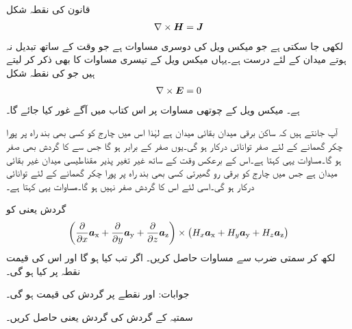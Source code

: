  قانون کی نقطہ شکل
\begin{align}\label{مساوات-مقناطیسی_مقناطیسی_گردش_صفر}
\nabla \times {\ensuremath{{\boldsymbol{H}}}}={{\boldsymbol{J}}}
\end{align}
لکھی جا سکتی ہے جو  میکس ویل کی دوسری مساوات ہے جو وقت کے ساتھ تبدیل نہ ہوتے میدان کے لئے درست ہے۔یہاں میکس ویل کے تیسری مساوات کا بھی ذکر کر لیتے ہیں جو  کی نقطہ شکل
\begin{align}\label{مساوات-مقناطیسی_برقی_گردش_صفر}
\nabla \times {\ensuremath{{\boldsymbol{E}}}}=0
\end{align}
ہے۔ میکس ویل کے چوتھی مساوات پر اس کتاب میں آگے غور کیا جائے گا۔

آپ جانتے ہیں کہ ساکن برقی میدان  بقائی میدان ہے لہٰذا اس میں چارج  کو کسی بھی بند راہ پر پورا چکر گھمانے کے لئے صفر توانائی درکار ہو گی۔یوں  صفر کے برابر ہو گا جس سے  کا گردش بھی صفر ہو گا۔مساوات  یہی کہتا ہے۔اس کے برعکس وقت کے ساتھ غیر تغیر پذیر مقناطیسی میدان غیر بقائی میدان ہے جس میں چارج کو برقی رو گھیرتی کسی بھی بند راہ پر پورا چکر گھمانے کے لئے توانائی درکار ہو گی۔اسی لئے اس کا گردش صفر نہیں ہو گا۔مساوات  یہی کہتا ہے۔


گردش یعنی  کو
\begin{align*}
\left(\frac{\partial }{\partial x}{\boldsymbol{a}}_{\textup{x}}+\frac{\partial }{\partial y}{\boldsymbol{a}}_{\textup{y}}+\frac{\partial }{\partial z}{\boldsymbol{a}}_{\textup{z}} \right) \times \left(H_x {\boldsymbol{a}}_{\textup{x}}+H_y {\boldsymbol{a}}_{\textup{y}}+H_z {\boldsymbol{a}}_{\textup{z}} \right)
\end{align*}
لکھ کر سمتی ضرب سے مساوات  حاصل کریں۔
اگر  تب  کیا ہو گا اور اس کی قیمت نقطہ  پر کیا ہو گی۔

جوابات: اور نقطے پر گردش کی قیمت  ہو گی۔

سمتیہ  کے گردش کی گردش یعنی  حاصل کریں۔

